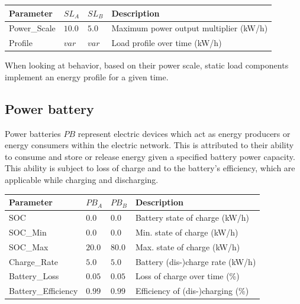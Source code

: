 \begin{table}[h]
	\renewcommand{\arraystretch}{1.3}
	\centering
	\begin{tabular}{llll}
		\hline
		\textbf{Parameter}              & \textbf{$SL_{A}$}  & \textbf{$SL_{B}$}   & \textbf{Description} \\ \hline
		Power\_Scale                   	  & $10.0$ & $5.0$ & Maximum power output multiplier (kW/h) \\
		Profile                       	  	   & $var$ & $var$ & Load profile over time  (kW/h)\\ \hline
	\end{tabular}
\end{table}

When looking at behavior, based on their power scale, static load components implement an energy profile for a given time.

\subsection{Power battery}

Power batteries $PB$ represent electric devices which act as energy producers or energy consumers within the electric network.
This is attributed to their ability to consume and store or release energy given a specified battery power capacity. This ability is subject to loss of charge and to the battery's efficiency, which are applicable while charging and discharging. 

\begin{table}[h]
	\renewcommand{\arraystretch}{1.3}
	\centering
	\begin{tabular}{llll}
		\hline
		\textbf{Parameter}     & \textbf{$PB_{A}$} & \textbf{$PB_{B}$} & \textbf{Description} \\ \hline
		SOC                     & $0.0$ & $0.0$ & Battery state of charge (kW/h)                   \\
		SOC\_Min                & $0.0$ & $0.0$ & Min. state of charge (kW/h)                   \\
		SOC\_Max               & $20.0$ & $80.0$ &  Max. state of charge (kW/h)                    \\
		Charge\_Rate            & $5.0$ & $5.0$ & Battery (dis-)charge rate (kW/h)     \\ 
		Battery\_Loss           & $0.05$ & $0.05$ & Loss of charge over time (\%)\\
		Battery\_Efficiency      & $0.99$ & $0.99$ &Efficiency of (dis-)charging (\%)     \\ \hline
	\end{tabular}
\end{table}

